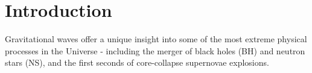 \documentclass{aa}
\begin{document}
{%
}
\maketitle

\section{Introduction}

Gravitational waves offer a unique insight into some of the most extreme physical processes in the Universe - including the merger of black holes (BH) and neutron stars (NS), and the first seconds of core-collapse supernovae explosions. 
\end{document}
